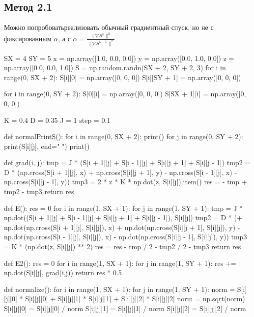 \documentclass[ 12pt,x11names]{article}
\begin{document}
 \subsection{Метод 2.1}
 Можно попробоватьреализовать обычный градиентный спуск, но не с фиксированным $\alpha$, а с $\alpha = \frac{\| \nabla S^k \|^2}{\| \nabla S^{k-1} \|^2}$\\
  \begin{python}

SX = 4
SY = 5
x = np.array([1.0, 0.0, 0.0])
y = np.array([0.0, 1.0, 0.0])
z = np.array([0.0, 0.0, 1.0])
S = np.random.randn(SX + 2, SY + 2, 3)
for i in range(0, SX + 2):
    S[i][0] = np.array([0, 0, 0])
    S[i][SY + 1] = np.array([0, 0, 0])

for i in range(0, SY + 2):
    S[0][i] = np.array([0, 0, 0])
    S[SX + 1][i] = np.array([0, 0, 0])

K = 0.4
D = 0.35
J = 1
step = 0.1

def normalPrintS():
    for i in range(0, SX + 2):
        print()
        for j in range(0, SY + 2):
            print(S[i][j], end=" ")
    print()


def grad(i, j):
    tmp = J * (S[i + 1][j] + S[i - 1][j] + S[i][j + 1] + S[i][j - 1])
    tmp2 = D * (np.cross(S[i + 1][j], x) + np.cross(S[i][j + 1], y) - np.cross(S[i - 1][j], x) - np.cross(S[i][j - 1], y))
    tmp3 = 2 * z * K * np.dot(z, S[i][j]).item()
    res = - tmp + tmp2 - tmp3
    return res


def E():
    res = 0
    for i in range(1, SX + 1):
        for j in range(1, SY + 1):
            tmp = J * np.dot((S[i + 1][j] + S[i - 1][j] + S[i][j + 1] + S[i][j - 1]), S[i][j])
            tmp2 = D * (+ np.dot(np.cross(S[i + 1][j], S[i][j]), x)
                        + np.dot(np.cross(S[i][j + 1], S[i][j]), y)
                        - np.dot(np.cross(S[i - 1][j], S[i][j]), x)
                        - np.dot(np.cross(S[i][j - 1], S[i][j]), y))
            tmp3 = K * (np.dot(z, S[i][j]) ** 2)
            res = res - tmp / 2 - tmp2 / 2 - tmp3
    return res

def E2():
    res = 0
    for i in range(1, SX + 1):
        for j in range(1, SY + 1):
            res += np.dot(S[i][j], grad(i,j))
    return res * 0.5

def normalize():
    for i in range(1, SX + 1):
        for j in range(1, SY + 1):
            norm = S[i][j][0] * S[i][j][0] + S[i][j][1] * S[i][j][1] + S[i][j][2] * S[i][j][2]
            norm = np.sqrt(norm)
            S[i][j][0] = S[i][j][0] / norm
            S[i][j][1] = S[i][j][1] / norm
            S[i][j][2] = S[i][j][2] / norm


\end{python}
\end{document}
